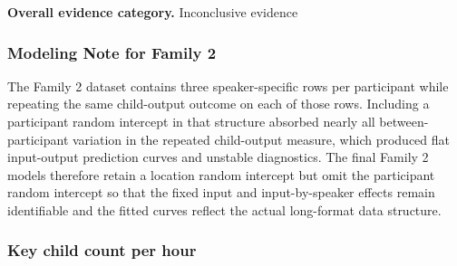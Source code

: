 \documentclass[
  letterpaper,
  DIV=11,
  numbers=noendperiod]{scrartcl}
\begin{document}
\textbf{Overall evidence category.} Inconclusive evidence

\hypertarget{modeling-note-for-family-2-1}{%
\subsubsection{Modeling Note for Family
2}\label{modeling-note-for-family-2-1}}

The Family 2 dataset contains three speaker-specific rows per
participant while repeating the same child-output outcome on each of
those rows. Including a participant random intercept in that structure
absorbed nearly all between-participant variation in the repeated
child-output measure, which produced flat input-output prediction curves
and unstable diagnostics. The final Family 2 models therefore retain a
location random intercept but omit the participant random intercept so
that the fixed input and input-by-speaker effects remain identifiable
and the fitted curves reflect the actual long-format data structure.

\hypertarget{key-child-count-per-hour-1}{%
\subsubsection{Key child count per
hour}\label{key-child-count-per-hour-1}}
\end{document}
